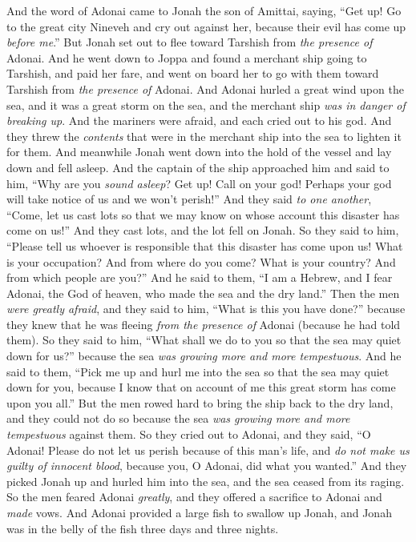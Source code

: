 
\begin{biblechapter} %
 And the word of Adonai came to Jonah the son of Amittai, saying,
\verse “Get up! Go to the great city Nineveh and cry out against her, because their evil has come up \textit{before me}.”
\verse But Jonah set out to flee toward Tarshish from \textit{the presence of} Adonai. And he went down to Joppa and found a merchant ship going to Tarshish, and paid her fare, and went on board her to go with them toward Tarshish from \textit{the presence of} Adonai.
\verse And Adonai hurled a great wind upon the sea, and it was a great storm on the sea, and the merchant ship \textit{was in danger of breaking up}.
\verse And the mariners were afraid, and each cried out to his god. And they threw the \textit{contents} that were in the merchant ship into the sea to lighten it for them. And meanwhile Jonah went down into the hold of the vessel and lay down and fell asleep.
\verse And the captain of the ship approached him and said to him, “Why are you \textit{sound asleep}? Get up! Call on your god! Perhaps your god will take notice of us and we won’t perish!”
\verse And they said \textit{to one another}, “Come, let us cast lots so that we may know on whose account this disaster has come on us!” And they cast lots, and the lot fell on Jonah.
\verse So they said to him, “Please tell us whoever is responsible that this disaster has come upon us! What is your occupation? And from where do you come? What is your country? And from which people are you?”
\verse And he said to them, “I am a Hebrew, and I fear Adonai, the God of heaven, who made the sea and the dry land.”
\verse Then the men \textit{were greatly afraid}, and they said to him, “What is this you have done?” because they knew that he was fleeing \textit{from the presence of} Adonai (because he had told them).
\verse So they said to him, “What shall we do to you so that the sea may quiet down for us?” because the sea \textit{was growing more and more tempestuous}.
\verse And he said to them, “Pick me up and hurl me into the sea so that the sea may quiet down for you, because I know that on account of me this great storm has come upon you all.”
\verse But the men rowed hard to bring the ship back to the dry land, and they could not do so because the sea \textit{was growing more and more tempestuous} against them.
\verse So they cried out to Adonai, and they said, “O Adonai! Please do not let us perish because of this man’s life, and \textit{do not make us guilty of innocent blood}, because you, O Adonai, did what you wanted.”
\verse And they picked Jonah up and hurled him into the sea, and the sea ceased from its raging.
\verse So the men feared Adonai \textit{greatly}, and they offered a sacrifice to Adonai and \textit{made} vows.
  And Adonai provided a large fish to swallow up Jonah, and Jonah was in the belly of the fish three days and three nights.
\end{biblechapter}

